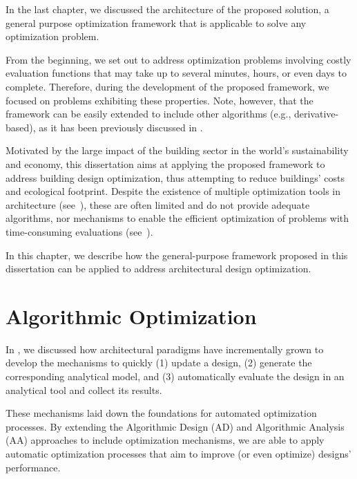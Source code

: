 \cleardoublepage
\label{chap:implement}

In the last chapter, we discussed the architecture of the proposed solution, a general purpose optimization framework that is applicable to solve any optimization problem. 

From the beginning, we set out to address optimization problems involving costly evaluation functions that may take up to several minutes, hours, or even days to complete. Therefore, during the development of the proposed framework, we focused on problems exhibiting these properties. Note, however, that the framework can be easily extended to include other algorithms (e.g., derivative-based), as it has been previously discussed in . 

Motivated by the large impact of the building sector in the world's sustainability and economy, this dissertation aims at applying the proposed framework to address building design optimization, thus attempting to reduce buildings' costs and ecological footprint. Despite the existence of multiple optimization tools in architecture (see~), these are often limited and do not provide adequate algorithms, nor mechanisms to enable the efficient optimization of problems with time-consuming evaluations (see~).

In this chapter, we describe how the general-purpose framework proposed in this dissertation can be applied to address architectural design optimization. 

\section{Algorithmic Optimization}

In , we discussed how architectural paradigms have incrementally grown to develop the mechanisms to quickly (1) update a design, (2) generate the corresponding analytical model, and (3) automatically evaluate the design in an analytical tool and collect its results. 

These mechanisms laid down the foundations for automated optimization processes. By extending the Algorithmic Design (AD) and Algorithmic Analysis (AA) approaches to include optimization mechanisms, we are able to apply automatic optimization processes that aim to improve (or even optimize) designs' performance. 


